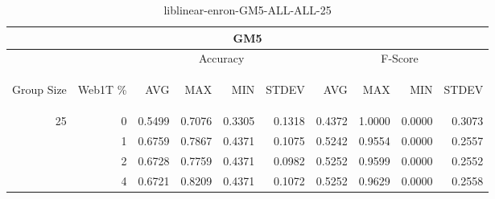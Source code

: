 \begin{center}
\begin{table}[htbp]
\begin{tabular}{ | r | r | r | r | r | r | r | r | r | r |}
\hline
\multicolumn{10}{|c|}{GM5}\\
\hline
 & & \multicolumn{4}{|c|}{Accuracy} & \multicolumn{4}{|c|}{F-Score}\\ \cline{3-10}
\begin{sideways}Group Size\end{sideways} & \begin{sideways}Web1T \%\end{sideways} & \begin{sideways}AVG\end{sideways} & \begin{sideways}MAX\end{sideways} & \begin{sideways}MIN\end{sideways} & \begin{sideways}STDEV\end{sideways} & \begin{sideways}AVG\end{sideways} & \begin{sideways}MAX\end{sideways} & \begin{sideways}MIN\end{sideways} & \begin{sideways}STDEV\end{sideways}\\
\hline
\multirow{4}{*}{25}
 & 0 & 0.5499 & 0.7076 & 0.3305 & 0.1318 & 0.4372 & 1.0000 & 0.0000 & 0.3073\\ \cline{2-10}
 & 1 & 0.6759 & 0.7867 & 0.4371 & 0.1075 & 0.5242 & 0.9554 & 0.0000 & 0.2557\\ \cline{2-10}
 & 2 & 0.6728 & 0.7759 & 0.4371 & 0.0982 & 0.5252 & 0.9599 & 0.0000 & 0.2552\\ \cline{2-10}
 & 4 & 0.6721 & 0.8209 & 0.4371 & 0.1072 & 0.5252 & 0.9629 & 0.0000 & 0.2558\\ \cline{2-10}
\hline
\end{tabular}
\caption{liblinear-enron-GM5-ALL-ALL-25}
\end{table}
\end{center}

